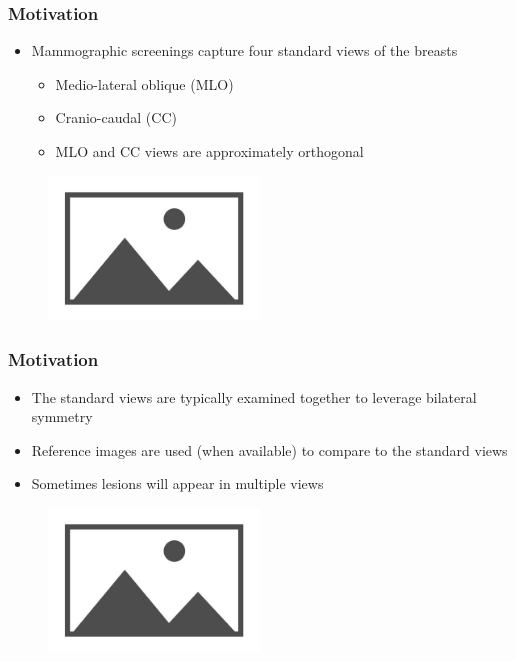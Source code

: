 \documentclass{beamer}
\begin{document}
\begin{frame}
   \frametitle{Motivation}
   \begin{itemize}
        \item Mammographic screenings capture four standard views of the breasts 
        \begin{itemize}
            \item Medio-lateral oblique (MLO)
            \item Cranio-caudal (CC)
            \item MLO and CC views are approximately orthogonal
        \end{itemize}
   \end{itemize}
   \begin{figure}
       \centering
       \includegraphics[width=0.5\textwidth]{placeholder.jpg}
   \end{figure}
\end{frame}

\begin{frame}
   \frametitle{Motivation}
   \begin{itemize}
        \item The standard views are typically examined together to leverage bilateral symmetry
        \item Reference images are used (when available) to compare to the standard views
        \item Sometimes lesions will appear in multiple views
   \end{itemize}
   \begin{figure}
       \centering
       \includegraphics[width=0.5\textwidth]{placeholder.jpg}
   \end{figure}
\end{frame}
\end{document}
